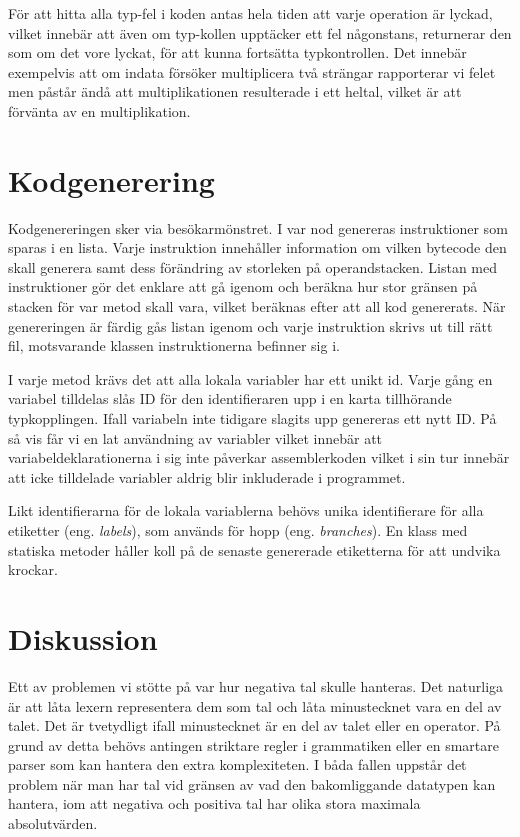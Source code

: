 \documentclass[a4paper,11pt]{article}
\newcommand{\trans}[2][eng.]{(#1 \emph{#2})}
\renewcommand{\*}[0]{\cdot}
\begin{document}
För att hitta alla typ-fel i koden antas hela tiden att varje operation är
lyckad, vilket innebär att även om typ-kollen upptäcker ett fel någonstans,
returnerar den som om det vore lyckat, för att kunna fortsätta typkontrollen.
Det innebär exempelvis att om indata försöker multiplicera två strängar
rapporterar vi felet men påstår ändå att multiplikationen resulterade i ett
heltal, vilket är att förvänta av en multiplikation.

\section*{Kodgenerering}

Kodgenereringen sker via besökarmönstret. I var nod genereras instruktioner som
sparas i en lista. Varje instruktion innehåller information om vilken bytecode
den skall generera samt dess förändring av storleken på operandstacken. Listan
med instruktioner gör det enklare att gå igenom och beräkna hur stor gränsen på
stacken för var metod skall vara, vilket beräknas efter att all kod genererats.
När genereringen är färdig gås listan igenom och varje instruktion skrivs ut
till rätt fil, motsvarande klassen instruktionerna befinner sig i.

I varje metod krävs det att alla lokala variabler har ett unikt id. Varje gång
en variabel tilldelas slås ID för den identifieraren upp i en karta tillhörande
typkopplingen. Ifall variabeln inte tidigare slagits upp genereras ett nytt ID.
På så vis får vi en lat användning av variabler vilket innebär att
variabeldeklarationerna i sig inte påverkar assemblerkoden vilket i sin tur
innebär att icke tilldelade variabler aldrig blir inkluderade i programmet.

Likt identifierarna för de lokala variablerna behövs unika identifierare för
alla etiketter \trans{labels}, som används för hopp \trans{branches}. En klass
med statiska metoder håller koll på de senaste genererade etiketterna för att
undvika krockar.

\section*{Diskussion}

Ett av problemen vi stötte på var hur negativa tal skulle hanteras. Det
naturliga är att låta lexern representera dem som tal och låta minustecknet
vara en del av talet. Det är tvetydligt ifall minustecknet är en del av talet
eller en operator. På grund av detta behövs antingen striktare regler i
grammatiken eller en smartare parser som kan hantera den extra komplexiteten.
I båda fallen uppstår det problem när man har tal vid gränsen av vad den
bakomliggande datatypen kan hantera, iom att negativa och positiva tal har
olika stora maximala absolutvärden.
\end{document}
